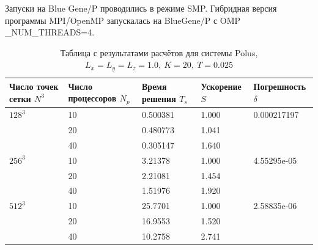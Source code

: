 \documentclass[oneside, final, 12pt]{extarticle}
\begin{document}
Запуски на Blue Gene/P проводились в режиме SMP.
Гибридная версия программы MPI/OpenMP запускалась на BlueGene/P с OMP \_NUM\_THREADS=4.

\begin{table}[H]
    \centering
    \begin{tabular}{|l|l|l|l|l|}
        \hline
        \makecell{Число точек \\сетки $ N^3 $} & \makecell{Число \\процессоров $ N_p $} & \makecell{Время \\решения $ T_s $} & Ускорение $ S $ & Погрешность $ \delta $ \\
        \hline
        $ 128^3 $                 & 10               & 0.500381 & 1.000  & 0.000217197 \\
        \cline{2-4}
                              & 20               & 0.480773 & 1.041  & \\
        \cline{2-4}
                              & 40              & 0.305147 & 1.640 & \\
        \hline
        $ 256^3 $                 & 10               & 3.21378 & 1.000  & 4.55295e-05 \\
        \cline{2-4}
                              & 20               & 2.21081 & 1.454  & \\
        \cline{2-4}
                              & 40              & 1.51976 & 1.920  & \\
        \hline
        $ 512^3 $                 & 10               & 25.7701 & 1.000  & 2.58835e-06 \\
        \cline{2-4}
                              & 20               & 16.9553 & 1.520 & \\
        \cline{2-4}
                              & 40              & 10.2758 & 2.741 & \\
        \hline
    \end{tabular}
    \caption{Таблица с результатами расчётов для системы Polus, $ L_x = L_y = L_z = 1.0, \: K = 20, \: T = 0.025 $}
\end{table}
\end{document}
